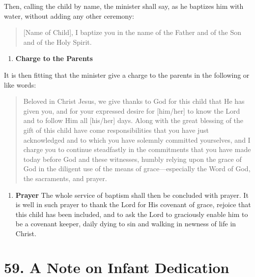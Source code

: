 \documentclass[
]{book}
\providecommand{\tightlist}{%
  \setlength{\itemsep}{0pt}\setlength{\parskip}{0pt}}
\begin{document}
\begin{enumerate}
  Then, calling the child by name, the minister shall say, as he baptizes him with water, without adding any other ceremony:

  \begin{quote}
  {[}Name of Child{]}, I baptize you in the name of the Father and of the Son and of the Holy Spirit.
  \end{quote}

  \begin{enumerate}
  \def\labelenumii{\alph{enumii}.}
  \setcounter{enumii}{7}
  \tightlist
  \item
    \textbf{Charge to the Parents}
  \end{enumerate}

  It is then fitting that the minister give a charge to the parents in the following or like words:

  \begin{quote}
  Beloved in Christ Jesus, we give thanks to God for this child that He has given you, and for your expressed desire for {[}him/her{]} to know the Lord and to follow Him all {[}his/her{]} days. Along with the great blessing of the gift of this child have come responsibilities that you have just acknowledged and to which you have solemnly committed yourselves, and I charge you to continue steadfastly in the commitments that you have made today before God and these witnesses, humbly relying upon the grace of God in the diligent use of the means of grace---especially the Word of God, the sacraments, and prayer.
  \end{quote}

  \begin{enumerate}
  \def\labelenumii{\roman{enumii}.}
  \tightlist
  \item
    \textbf{Prayer}
    The whole service of baptism shall then be concluded with prayer. It is well in such prayer to thank the Lord for His covenant of grace, rejoice that this child has been included, and to ask the Lord to graciously enable him to be a covenant keeper, daily dying to sin and walking in newness of life in Christ.
  \end{enumerate}
\end{enumerate}

\hypertarget{a-note-on-infant-dedication}{%
\section*{59. A Note on Infant Dedication}\label{a-note-on-infant-dedication}}
\end{document}
